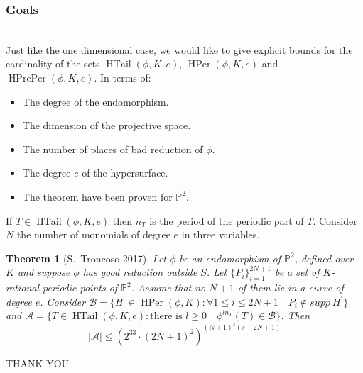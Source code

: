 \documentclass{beamer}
\def\jump{ \quad \\ \vspace{0.7cm} \pause}
\def\PP{{\mathbb P}}
\DeclareMathOperator{\HTail}{HTail}
\DeclareMathOperator{\HPer}{HPer}
\DeclareMathOperator{\HPrePer}{HPrePer}
\theoremstyle{thmstyle}
\theoremstyle{thmstyle}
\newtheorem*{mythm}{Theorem}
\theoremstyle{mystyle}
\theoremstyle{qstnstyle}
\begin{document}
\begin{frame}
\frametitle{Goals}

\jump
Just like the one dimensional case, we would like to give explicit bounds for the cardinality of the sets $\HTail(\phi,K,e)$, $\HPer(\phi,K,e)$  and $\HPrePer(\phi,K,e)$. In terms of:\pause
\begin{itemize}
\item The degree of the endomorphism.
\pause
\item The dimension of the projective space.
\pause
\item The number of places of bad reduction of $\phi$.
\pause
\item The degree $e$ of the hypersurface.
\end{itemize}


\end{frame}

\begin{frame}
\begin{itemize}
\item The theorem have been proven for $\PP^2$.
\end{itemize}
\pause
If $T \in \HTail(\phi,K, e)$ then $n_T$ is the period of the periodic part of $T$. Consider $N$ the number of monomials of degree $e$ in three variables. \pause

\begin{mythm}[S.\ Troncoso 2017]
Let $\phi$ be an endomorphism of $\PP^2$, defined over $K$ and suppose $\phi$ has good reduction outside $S$. Let $\{P_i\}_{i=1}^{2N+1} $ be a set of $K$-rational periodic points of $\PP^2$. Assume that no $N+1$ of them lie in a curve of degree $e$. Consider $\mathcal{B} =\{ H^{\prime} \in \HPer(\phi,K) \colon \forall  1 \leq i \leq 2N+1 \quad P_i \notin  supp\ H^{\prime}     \} $ and $\mathcal{A}=\{ T \in \HTail(\phi,K, e) \colon \mbox{there is } l\geq 0 \quad \phi^{ln_T}(T) \in \mathcal{B}   \}$.  Then
 $$ |\mathcal{A} | \leq \left(2^{33} \cdot (2N+1)^2\right)^{\left(N+1\right)^3(s+2N+1)}  $$
\end{mythm}


\end{frame}

\begin{frame}
\Huge{THANK YOU}
\end{frame}
\end{document}
